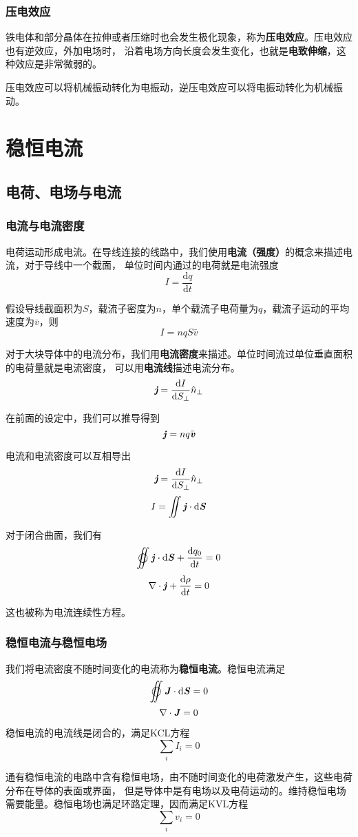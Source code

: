 \documentclass[UTF8,openany]{book}
\begin{document}
	\subsection{压电效应}
	\par 铁电体和部分晶体在拉伸或者压缩时也会发生极化现象，称为\textbf{压电效应}。压电效应也有逆效应，外加电场时，
	沿着电场方向长度会发生变化，也就是\textbf{电致伸缩}，这种效应是非常微弱的。
	\par 压电效应可以将机械振动转化为电振动，逆压电效应可以将电振动转化为机械振动。
	
	\chapter{稳恒电流}
	\section{电荷、电场与电流}
	\subsection{电流与电流密度}
	\par 电荷运动形成电流。在导线连接的线路中，我们使用\textbf{电流（强度）}的概念来描述电流，对于导线中一个截面，
	单位时间内通过的电荷就是电流强度
	$$I=\frac{\mathrm{d}q}{\mathrm{d}t}$$
	\par 假设导线截面积为$S$，载流子密度为$n$，单个载流子电荷量为$q$，载流子运动的平均速度为$\bar{v}$，则
	$$I=nqS\bar{v}$$
	\par 对于大块导体中的电流分布，我们用\textbf{电流密度}来描述。单位时间流过单位垂直面积的电荷量就是电流密度，
	可以用\textbf{电流线}描述电流分布。
	$$\textit{\textbf{j}}=\frac{\mathrm{d}I}{\mathrm{d}S_\perp}\hat{n}_\perp$$
	\par 在前面的设定中，我们可以推导得到
	$$\textbf{\textit{j}}=nq\bar{\textit{\textbf{v}}}$$
	\par 电流和电流密度可以互相导出
	$$\textit{\textbf{j}}=\frac{\mathrm{d}I}{\mathrm{d}S_\perp}\hat{n}_\perp$$
	$$I=\iint\textbf{\textit{j}}\cdot\mathrm{d}\textbf{\textit{S}}$$
	\par 对于闭合曲面，我们有
	$$\varoiint\textbf{\textit{j}}\cdot\mathrm{d}\textbf{\textit{S}}+\frac{\mathrm{d}q_0}{\mathrm{d}t}=0$$
	$$\nabla\cdot\textbf{\textit{j}}+\frac{\mathrm{d}\rho}{\mathrm{d}t}=0$$
	\par 这也被称为电流连续性方程。
	\subsection{稳恒电流与稳恒电场}
	\par 我们将电流密度不随时间变化的电流称为\textbf{稳恒电流}。稳恒电流满足
	$$\varoiint\textbf{\textit{J}}\cdot\mathrm{d}\textbf{\textit{S}}=0$$
	$$\nabla\cdot\textbf{\textit{J}}=0$$
	\par 稳恒电流的电流线是闭合的，满足KCL方程
	$$\sum_{i}I_{i}=0$$
	\par 通有稳恒电流的电路中含有稳恒电场，由不随时间变化的电荷激发产生，这些电荷分布在导体的表面或界面，
	但是导体中是有电场以及电荷运动的。维持稳恒电场需要能量。稳恒电场也满足环路定理，因而满足KVL方程
	$$\sum_{i}v_{i}=0$$
\end{document}
